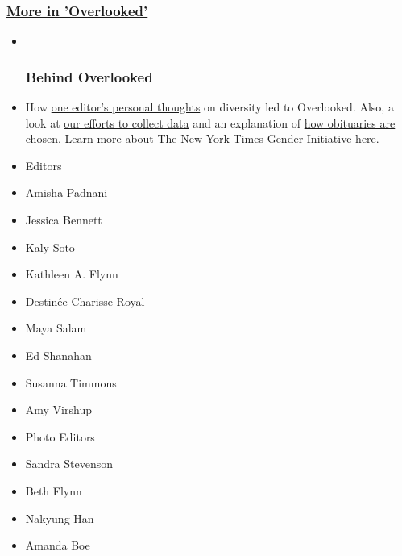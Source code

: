 \hypertarget{more-in-overlooked}{%
\subsubsection{\texorpdfstring{\href{https://www.nytimes3xbfgragh.onion/spotlight/overlooked}{More
in 'Overlooked'}}{More in 'Overlooked'}}\label{more-in-overlooked}}

\begin{itemize}
\item ~
  \hypertarget{behind-overlooked}{%
  \subsubsection{Behind Overlooked}\label{behind-overlooked}}
\item
  How
  \href{https://www.nytimes3xbfgragh.onion/2018/03/08/insider/overlooked-obituary.html}{one
  editor's personal thoughts} on diversity led to Overlooked. Also, a
  look at
  \href{https://www.nytimes3xbfgragh.onion/2018/03/14/insider/women-obituaries.html}{our
  efforts to collect data} and an explanation of
  \href{https://www.nytimes3xbfgragh.onion/2018/03/08/obituaries/overlooked-from-the-death-desk-why-most-obits-are-still-of-white-men.html}{how
  obituaries are chosen}. Learn more about The New York Times Gender
  Initiative
  \href{https://www.nytimes3xbfgragh.onion/2017/12/13/reader-center/jessica-bennett-our-new-gender-editor-answers-your-questions.html}{here}.
\end{itemize}

\begin{itemize}
\tightlist
\item
  Editors
\item
  Amisha Padnani
\item
  Jessica Bennett
\item
  Kaly Soto
\item
  Kathleen A. Flynn
\item
  Destinée-Charisse Royal
\item
  Maya Salam
\item
  Ed Shanahan
\item
  Susanna Timmons
\item
  Amy Virshup
\end{itemize}

\begin{itemize}
\tightlist
\item
  Photo Editors
\item
  Sandra Stevenson
\item
  Beth Flynn
\item
  Nakyung Han
\item
  Amanda Boe
\end{itemize}

